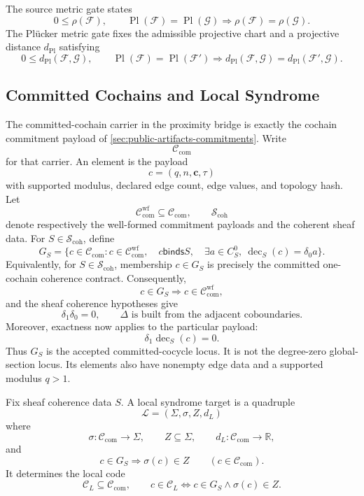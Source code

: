 The source metric gate states
\[
  0\le \rho(\mathcal F),\qquad
  \operatorname{Pl}(\mathcal F)=\operatorname{Pl}(\mathcal G)
  \Longrightarrow
  \rho(\mathcal F)=\rho(\mathcal G).
\]
The Pl\"ucker metric gate fixes the admissible projective chart and a projective
distance \(d_{\mathrm{Pl}}\) satisfying
\[
  0\le d_{\mathrm{Pl}}(\mathcal F,\mathcal G),
  \qquad
  \operatorname{Pl}(\mathcal F)=\operatorname{Pl}(\mathcal F')
  \Longrightarrow
  d_{\mathrm{Pl}}(\mathcal F,\mathcal G)
  =d_{\mathrm{Pl}}(\mathcal F',\mathcal G).
\]

\subsection{Committed Cochains and Local Syndrome}

The committed-cochain carrier in the proximity bridge is exactly the cochain
commitment payload of \cref{sec:public-artifacts-commitments}. Write
\[
  \mathcal C_{\mathrm{com}}
\]
for that carrier. An element is the payload
\[
  c=(q,n,\mathbf c,\tau)
\]
with supported modulus, declared edge count, edge values, and topology hash.
Let
\[
  \mathcal C_{\mathrm{com}}^{\mathrm{wf}}\subseteq\mathcal C_{\mathrm{com}},
  \qquad
  \mathcal S_{\mathrm{coh}}
\]
denote respectively the well-formed commitment payloads and the coherent sheaf
data. For \(S\in\mathcal S_{\mathrm{coh}}\), define
\[
  G_S=\{c\in\mathcal C_{\mathrm{com}}:
  c\in\mathcal C_{\mathrm{com}}^{\mathrm{wf}},\quad
  c\mathrel{\mathsf{binds}}S,\quad
  \exists a\in C_S^0,\ \operatorname{dec}_S(c)=\delta_0a\}.
\]
Equivalently, for \(S\in\mathcal S_{\mathrm{coh}}\), membership
\(c\in G_S\) is precisely the committed one-cochain coherence contract.
Consequently,
\[
  c\in G_S
  \Longrightarrow
  c\in\mathcal C_{\mathrm{com}}^{\mathrm{wf}},
\]
and the sheaf coherence hypotheses give
\[
  \delta_1\delta_0=0,
  \qquad
  \Delta\text{ is built from the adjacent coboundaries}.
\]
Moreover, exactness now applies to the particular payload:
\[
  \delta_1\operatorname{dec}_S(c)=0.
\]
Thus \(G_S\) is the accepted committed-cocycle locus. It is not the
degree-zero global-section locus. Its elements also have nonempty edge data
and a supported modulus \(q>1\).

\begin{definition}\label{def:local-syndrome-target}
Fix sheaf coherence data \(S\). A local syndrome target is a quadruple
\[
  \mathcal L=(\Sigma,\sigma,Z,d_L)
\]
where
\[
  \sigma:\mathcal C_{\mathrm{com}}\to\Sigma,\qquad
  Z\subseteq\Sigma,\qquad
  d_L:\mathcal C_{\mathrm{com}}\to\mathbb R,
\]
and
\[
  c\in G_S\Longrightarrow \sigma(c)\in Z
  \qquad(c\in\mathcal C_{\mathrm{com}}).
\]
It determines the local code
\[
  \mathcal C_L\subseteq\mathcal C_{\mathrm{com}},\qquad
  c\in\mathcal C_L
  \Longleftrightarrow
  c\in G_S\wedge \sigma(c)\in Z.
\]
\end{definition}

